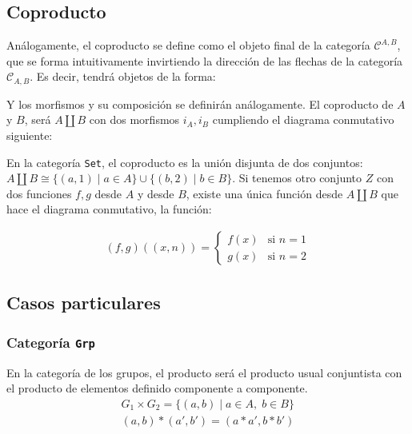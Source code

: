 \documentclass[11pt, fleqn, spanish]{book}
\newcommand{\C}{\mathcal{C}}
\newcommand{\twopartdef}[4]
{
  \left\{
    \begin{array}{ll}
      #1 & \mbox{si } #2 \\
      #3 & \mbox{si } #4
    \end{array}
  \right.
}
\begin{document}
\subsection{Coproducto}
Análogamente, el coproducto se define como el objeto final de la
categoría $\C^{A,B}$, que se forma intuitivamente invirtiendo la
dirección de las flechas de la categoría $\C_{A,B}$.  Es decir, tendrá
objetos de la forma:

\begin{center}
\end{center}

Y los morfismos y su composición se definirán análogamente.
El coproducto de $A$ y $B$, será $A \amalg B$ con dos morfismos $i_A,i_B$ cumpliendo
el diagrama conmutativo siguiente:

\begin{center}
\end{center}

\begin{example} 
  En la categoría \texttt{Set}, el coproducto es la unión disjunta de
  dos conjuntos:
  $A \amalg B \cong \{(a,1) \; | \; a \in A\} \cup \{(b,2) \; | \; b
  \in B \}$. Si tenemos otro conjunto $Z$ con dos funciones $f,g$
  desde $A$ y desde $B$, existe una única función desde $A \amalg B$
  que hace el diagrama conmutativo, la función:
  
  \begin{gather*}
    (f,g)((x,n)) = \twopartdef{f(x)}{n = 1}{g(x)}{n = 2}
  \end{gather*}
\end{example}


    
\subsection{Casos particulares}
\subsubsection{Categoría \texttt{Grp}}
En la categoría de los grupos, el producto será el producto usual conjuntista con el
producto de elementos definido componente a componente.
\begin{align*}
  G_1 \times G_2 = \{(a,b)\; |\; a \in A,\; b \in B\} \\
  (a,b) \ast (a',b') = (a \ast a', b \ast b')
\end{align*}
\end{document}
